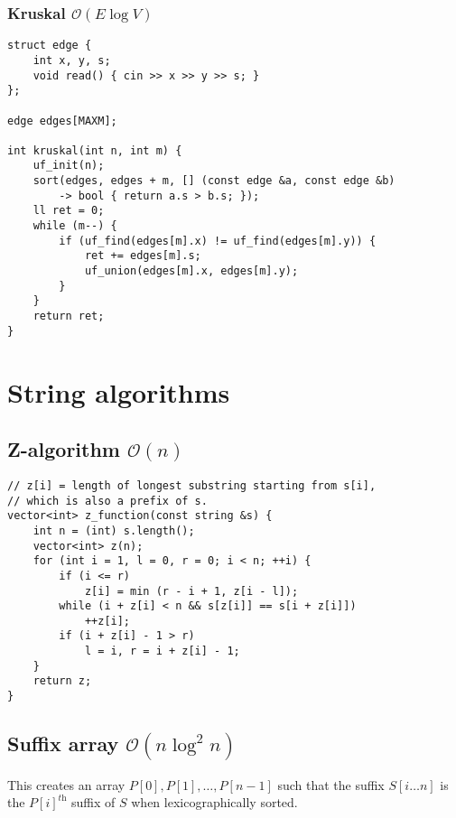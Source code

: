 \documentclass{article}
\begin{document}
\subsubsection{Kruskal $\mathcal{O}(E \log V)$}

\begin{lstlisting}
struct edge {
	int x, y, s;
	void read() { cin >> x >> y >> s; }
};

edge edges[MAXM];

int kruskal(int n, int m) {
	uf_init(n);
	sort(edges, edges + m, [] (const edge &a, const edge &b)
		-> bool { return a.s > b.s; });
	ll ret = 0;
	while (m--) {
		if (uf_find(edges[m].x) != uf_find(edges[m].y)) {
			ret += edges[m].s;
			uf_union(edges[m].x, edges[m].y);
		}
	}
	return ret;
}

\end{lstlisting}

\section{String algorithms}
\subsection{Z-algorithm $\mathcal{O}(n)$}

\begin{lstlisting}
// z[i] = length of longest substring starting from s[i],
// which is also a prefix of s.
vector<int> z_function(const string &s) {
	int n = (int) s.length();
	vector<int> z(n);
	for (int i = 1, l = 0, r = 0; i < n; ++i) {
		if (i <= r)
			z[i] = min (r - i + 1, z[i - l]);
		while (i + z[i] < n && s[z[i]] == s[i + z[i]])
			++z[i];
		if (i + z[i] - 1 > r)
			l = i, r = i + z[i] - 1;
	}
	return z;
}
\end{lstlisting}

\subsection{Suffix array $\mathcal{O}(n \log^2{n})$}

This creates an array $P[0], P[1], \dots, P[n-1]$ such that the suffix $S[i \dots n]$ is the $P[i]^\textit{th}$ suffix of $S$ when lexicographically sorted.
\end{document}
